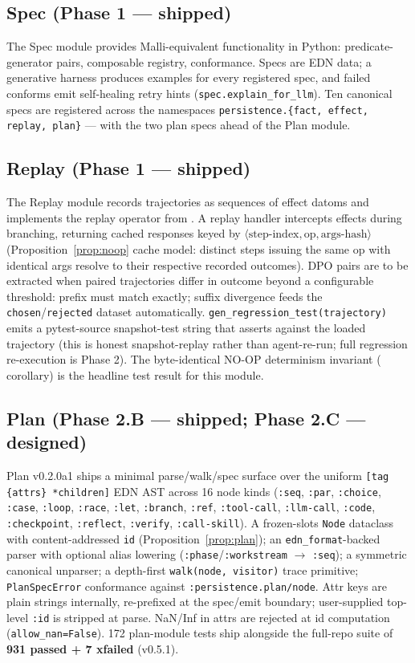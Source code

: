 \documentclass[anon]{nesy2026}   %
\newcommand{\C}[1]{\texttt{#1}}
\begin{document}
\subsection{Spec (Phase 1 --- shipped)}\label{sec:impl-spec}

The Spec module provides Malli-equivalent functionality in Python: predicate-generator pairs, composable registry, conformance. Specs are EDN data; a generative harness produces examples for every registered spec, and failed conforms emit self-healing retry hints (\C{spec.explain\_for\_llm}). Ten canonical specs are registered across the namespaces \C{persistence.\{fact, effect, replay, plan\}} --- with the two plan specs ahead of the Plan module.

\subsection{Replay (Phase 1 --- shipped)}\label{sec:impl-replay}

The Replay module records trajectories as sequences of effect datoms and implements the replay operator from . A replay handler intercepts effects during branching, returning cached responses keyed by $\langle \text{step-index}, \text{op}, \text{args-hash} \rangle$ (Proposition~\ref{prop:noop} cache model: distinct steps issuing the same op with identical args resolve to their respective recorded outcomes). DPO pairs are to be extracted when paired trajectories differ in outcome beyond a configurable threshold: prefix must match exactly; suffix divergence feeds the \C{chosen}/\C{rejected} dataset automatically. \C{gen\_regression\_test(trajectory)} emits a pytest-source snapshot-test string that asserts against the loaded trajectory (this is honest snapshot-replay rather than agent-re-run; full regression re-execution is Phase 2). The byte-identical NO-OP determinism invariant ( corollary) is the headline test result for this module.

\subsection{Plan (Phase 2.B --- shipped; Phase 2.C --- designed)}\label{sec:impl-plan}

Plan v0.2.0a1 ships a minimal parse/walk/spec surface over the uniform \C{[tag \{attrs\} *children]} EDN AST across 16 node kinds (\C{:seq}, \C{:par}, \C{:choice}, \C{:case}, \C{:loop}, \C{:race}, \C{:let}, \C{:branch}, \C{:ref}, \C{:tool-call}, \C{:llm-call}, \C{:code}, \C{:checkpoint}, \C{:reflect}, \C{:verify}, \C{:call-skill}). A frozen-slots \C{Node} dataclass with content-addressed \C{id} (Proposition~\ref{prop:plan}); an \C{edn\_format}-backed parser with optional alias lowering (\C{:phase}/\C{:workstream} $\to$ \C{:seq}); a symmetric canonical unparser; a depth-first \C{walk(node, visitor)} trace primitive; \C{PlanSpecError} conformance against \C{:persistence.plan/node}. Attr keys are plain strings internally, re-prefixed at the spec/emit boundary; user-supplied top-level \C{:id} is stripped at parse. NaN/Inf in attrs are rejected at id computation (\C{allow\_nan=False}). 172 plan-module tests ship alongside the full-repo suite of \textbf{931 passed + 7 xfailed} (v0.5.1).
\end{document}

